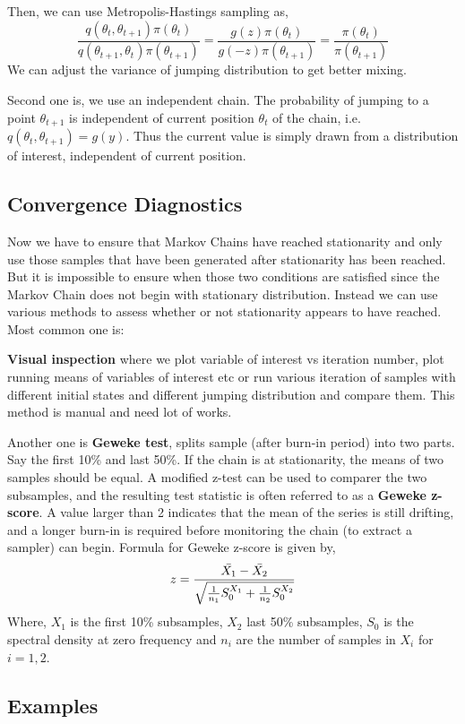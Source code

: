 Then, we can use Metropolis-Hastings sampling as,
\[
	\frac{q(\theta_t,\theta_{t+1})\pi(\theta_t)}{q(\theta_{t+1},\theta_{t})\pi(\theta_{t+1})}  = \frac{g(z)\pi(\theta_t)}{g(-z)\pi(\theta_{t+1})} = \frac{\pi(\theta_t)}{\pi(\theta_{t+1})}
\]
We can adjust the variance of jumping distribution to get better mixing.

Second one is, we use an independent chain. The probability of jumping to a point $ \theta_{t+1} $ is independent of current position $ \theta_t $ of the chain, i.e. $ q(\theta_t,\theta_{t+1}) = g(y) $. Thus the current value is simply drawn from a distribution of interest, independent of current position.

\subsection{Convergence Diagnostics}
Now we have to ensure that Markov Chains have reached stationarity and only use those samples that have been generated after stationarity has been reached. But it is impossible to ensure when those two conditions are satisfied since the Markov Chain does not begin with stationary distribution. Instead we can use various methods to assess whether or not stationarity appears to have reached. Most common one is:

\textbf{Visual inspection} where we plot variable of interest vs iteration number, plot running means of variables of interest etc or run various iteration of samples with different initial states and different jumping distribution and compare them. This method is manual and need lot of works.

Another one is \textbf{Geweke test}, splits sample (after burn-in period) into two parts.
Say the first 10\% and last 50\%. If the chain is at stationarity, the means of two samples should be equal. A modified z-test can be used to comparer the two subsamples,
and the resulting test statistic is often referred to as a \textbf{Geweke z-score}.
A value larger than 2 indicates that the mean of
the series is still drifting, and a longer burn-in is required before monitoring the
chain (to extract a sampler) can begin. Formula for Geweke z-score is given by,
\[
	z = \frac{\Bar{X_1} - \Bar{X_2}}{\sqrt{ \frac{ 1 }{ n_1 }S^{X_1}_0 + \frac{ 1 }{ n_2 }S^{X_2}_0 }}
\]
Where, $ X_1 $ is the first 10\% subsamples, $ X_2 $ last 50\% subsamples, $ S_0 $ is the spectral density at zero frequency and $ n_i $ are the number of samples in $ X_i $ for $ i = 1,2 $.

\subsection{Examples}

